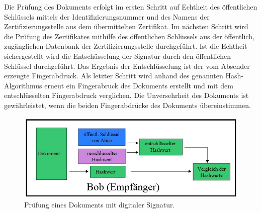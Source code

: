 Die Prüfung des Dokuments erfolgt im ersten Schritt auf Echtheit des 
öffentlichen Schlüssels mittels der Identifizierungsnummer und des 
Namens der Zertifizierungsstelle aus dem übermittelten Zertifikat. 
Im nächsten Schritt wird die Prüfung des Zertifikates mithilfe des 
öffentlichen Schlüssels aus der öffentlich, zugänglichen Datenbank 
der Zertifizierungsstelle durchgeführt. Ist die Echtheit sichergestellt 
wird die Entschüsselung der Signatur durch den öffentlichen Schlüssel 
durchgeführt. Das Ergebnis der Entschlüsselung ist der vom Absender 
erzeugte Fingerabdruck. Als letzter Schritt wird anhand des genannten 
Hash-Algorithmus erneut ein Fingerabruck des Dokuments erstellt und 
mit dem entschlüsselten Fingerabdruck verglichen. Die Unversehrheit 
des Dokuments ist gewährleistet, wenn die beiden Fingerabdrücke des 
Dokuments übereinstimmen. \cite{techno1}
\begin{figure}[!ht]
    \centering
    \includegraphics[width=\textwidth]{PruefungEmpfaenger2.jpg}
    \caption[Prüfung eines Dokuments mit digitaler Signatur]{\small{Prüfung eines Dokuments mit digitaler Signatur. \cite{techno3}}}
    \label{fig:3}
\end{figure}